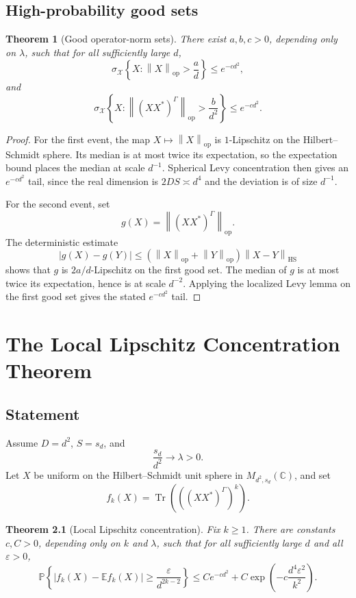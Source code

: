 \documentclass[11pt,oneside]{book}
\newtheorem{theorem}{Theorem}[chapter]
\DeclareMathOperator{\Tr}{Tr}
\newcommand{\C}{\mathbb C}
\newcommand{\E}{\mathbb E}
\newcommand{\Prob}{\mathbb P}
\newcommand{\1}{\mathbf 1}
\newcommand{\eps}{\varepsilon}
\newcommand{\GammaPT}{\Gamma}
\newcommand{\HS}{\mathrm{HS}}
\newcommand{\op}{\mathrm{op}}
\newcommand{\abs}[1]{\left|#1\right|}
\newcommand{\norm}[1]{\left\|#1\right\|}
\begin{document}
\section{High-probability good sets}

\begin{theorem}[Good operator-norm sets]
There exist \(a,b,c>0\), depending only on \(\lambda\), such that for all
sufficiently large \(d\),
\[
  \sigma_{\mathcal X}
  \left\{X:\norm X_{\op}>\frac ad\right\}
  \le e^{-cd^2},
\]
and
\[
  \sigma_{\mathcal X}
  \left\{X:\norm{(XX^*)^{\GammaPT}}_{\op}>\frac b{d^2}\right\}
  \le e^{-cd^2}.
\]
\end{theorem}

\begin{proof}
For the first event, the map \(X\mapsto\norm X_{\op}\) is \(1\)-Lipschitz on
the Hilbert--Schmidt sphere.  Its median is at most twice its expectation, so
the expectation bound places the median at scale \(d^{-1}\).  Spherical Levy
concentration then gives an \(e^{-cd^2}\) tail, since the real dimension is
\(2DS\asymp d^4\) and the deviation is of size \(d^{-1}\).

For the second event, set
\[
  g(X)=\norm{(XX^*)^{\GammaPT}}_{\op}.
\]
The deterministic estimate
\[
  |g(X)-g(Y)|
  \le
  (\norm X_{\op}+\norm Y_{\op})\norm{X-Y}_{\HS}
\]
shows that \(g\) is \(2a/d\)-Lipschitz on the first good set.  The median of
\(g\) is at most twice its expectation, hence is at scale \(d^{-2}\).  Applying
the localized Levy lemma on the first good set gives the stated
\(e^{-cd^2}\) tail.
\end{proof}

\chapter{The Local Lipschitz Concentration Theorem}

\section{Statement}

Assume \(D=d^2\), \(S=s_d\), and
\[
  \frac{s_d}{d^2}\longrightarrow \lambda>0.
\]
Let \(X\) be uniform on the Hilbert--Schmidt unit sphere in
\(M_{d^2,s_d}(\C)\), and set
\[
  f_k(X)=\Tr\left(\left((XX^*)^{\GammaPT}\right)^k\right).
\]

\begin{theorem}[Local Lipschitz concentration]
Fix \(k\ge1\).  There are constants \(c,C>0\), depending only on \(k\) and
\(\lambda\), such that for all sufficiently large \(d\) and all
\(\eps>0\),
\[
  \Prob\left\{
    \abs{f_k(X)-\E f_k(X)}
    \ge
    \frac{\eps}{d^{2k-2}}
  \right\}
  \le
  C e^{-cd^2}
  +
  C\exp\left(-c\frac{d^4\eps^2}{k^2}\right).
\]
\end{theorem}
\end{document}
